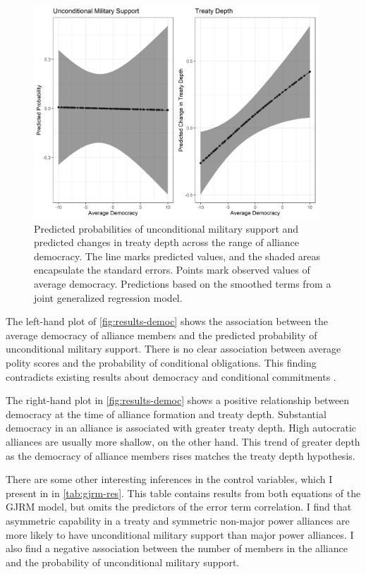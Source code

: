 \documentclass[12pt]{article}
\begin{document}
\begin{figure}[hbtp]
\centering
\includegraphics[width=0.95\textwidth]{../figures/results-democ.png}
\caption{Predicted probabilities of unconditional military support and predicted changes in treaty depth across the range of alliance democracy. The line marks predicted values, and the shaded areas encapsulate the standard errors. Points mark observed values of average democracy. Predictions based on the smoothed terms from a joint generalized regression model.}
\label{fig:results-democ}
\end{figure}


The left-hand plot of \autoref{fig:results-democ} shows the association between the average democracy of alliance members and the predicted probability of unconditional military support. 
There is no clear association between average polity scores and the probability of conditional obligations. 
This finding contradicts existing results about democracy and conditional commitments \citep{Mattes2012, Chibaetal2015}.


The right-hand plot in \autoref{fig:results-democ} shows a positive relationship between democracy at the time of alliance formation and treaty depth. 
Substantial democracy in an alliance is associated with greater treaty depth. 
High autocratic alliances are usually more shallow, on the other hand. 
This trend of greater depth as the democracy of alliance members rises matches the treaty depth hypothesis. 


There are some other interesting inferences in the control variables, which I present in in \autoref{tab:gjrm-res}. 
This table contains results from both equations of the GJRM model, but omits the predictors of the error term correlation. 
I find that asymmetric capability in a treaty and symmetric non-major power alliances are more likely to have unconditional military support than major power alliances. 
I also find a negative association between the number of members in the alliance and the probability of unconditional military support. 
\end{document}
